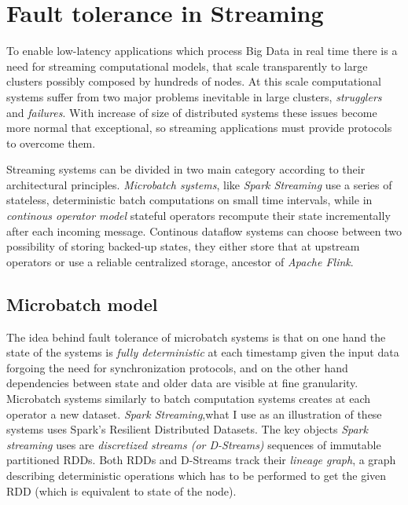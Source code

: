 \section{Fault tolerance in Streaming}\label{ft}


To enable low-latency applications which process Big Data in real time there is a need for streaming computational models, that scale transparently to large clusters possibly composed by hundreds of nodes. At this scale computational systems suffer from two major problems inevitable in large clusters, \textit{strugglers} and \textit{failures}. With increase of size of distributed systems these issues become more normal that exceptional, so streaming applications must provide protocols to overcome them.

Streaming systems can be divided in two main category according to their architectural principles. \textit{Microbatch systems}, like \textit{Spark Streaming} \cite{discretizedstreams} use a series of stateless, deterministic batch computations on small time intervals, while in \textit{continous operator model} stateful operators recompute their state incrementally after each incoming message. Continous dataflow systems can choose between two possibility of storing backed-up states, they either store that at upstream operators\cite{mapreduceonline}\cite{storm} or use a reliable centralized storage\cite{millwheel}\cite{stratosphere}, ancestor of \textit{Apache Flink}. 
\subsection{Microbatch model}


The idea behind fault tolerance of microbatch systems is that on one hand the state of the systems is \textit{fully deterministic} at each timestamp given the input data forgoing the need for synchronization protocols, and on the other hand dependencies between state and older data are visible at fine granularity. Microbatch systems similarly to batch computation systems creates at each operator a new dataset.  \textit{Spark Streaming},what I use as an illustration of these systems uses  Spark's Resilient Distributed Datasets\cite{rdd}. The key objects \textit{Spark streaming} uses are \textit{discretized streams (or D-Streams)} sequences of immutable partitioned RDDs. Both RDDs and D-Streams track their \textit{lineage graph}, a graph describing deterministic operations which has to be performed to get the given RDD (which is equivalent to state of the node).

